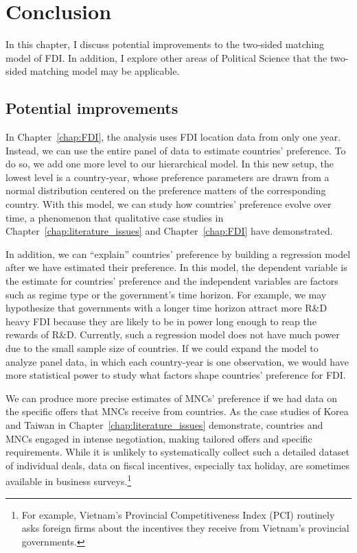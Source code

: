 \chapter{Conclusion}
\label{chap:conclusion}

In this chapter, I discuss potential improvements to the two-sided matching
model of FDI. In addition, I explore other areas of Political Science that the
two-sided matching model may be applicable.

\section{Potential improvements}

In Chapter~\ref{chap:FDI}, the analysis uses FDI location data from only one
year. Instead, we can use the entire panel of data to estimate countries'
preference. To do so, we add one more level to our hierarchical model. In this
new setup, the lowest level is a country-year, whose preference parameters are
drawn from a normal distribution centered on the preference matters of the
corresponding country. With this model, we can study how countries' preference
evolve over time, a phenomenon that qualitative case studies in
Chapter~\ref{chap:literature_issues} and Chapter~\ref{chap:FDI} have
demonstrated.

In addition, we can ``explain'' countries' preference by building a regression
model after we have estimated their preference. In this model, the dependent
variable is the estimate for countries' preference and the independent variables
are factors such as regime type or the government's time horizon. For example,
we may hypothesize that governments with a longer time horizon attract more R\&D
heavy FDI because they are likely to be in power long enough to reap the rewards
of R\&D. Currently, such a regression model does not have much power due to the
small sample size of countries. If we could expand the model to analyze panel
data, in which each country-year is one observation, we would have more
statistical power to study what factors shape countries' preference for FDI.

We can produce more precise estimates of MNCs' preference if we had data on the
specific offers that MNCs receive from countries. As the case studies of Korea
and Taiwan in Chapter~\ref{chap:literature_issues} demonstrate, countries and
MNCs engaged in intense negotiation, making tailored offers and specific
requirements. While it is unlikely to systematically collect such a detailed
dataset of individual deals, data on fiscal incentives, especially tax holiday,
are sometimes available in business surveys.\footnote{For example, Vietnam's
  Provincial Competitiveness Index (PCI) routinely asks foreign firms about the
  incentives they receive from Vietnam's provincial governments.}

